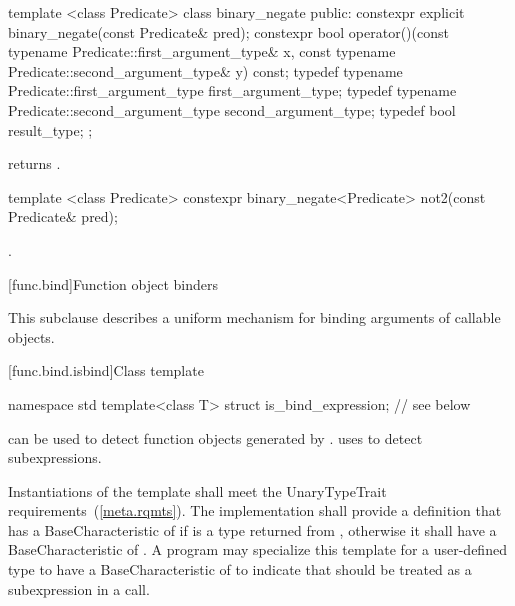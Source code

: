 %
\begin{itemdecl}
template <class Predicate>
  class binary_negate {
  public:
    constexpr explicit binary_negate(const Predicate& pred);
    constexpr bool operator()(const typename Predicate::first_argument_type& x,
        const typename Predicate::second_argument_type& y) const;
  typedef typename Predicate::first_argument_type first_argument_type;
  typedef typename Predicate::second_argument_type second_argument_type;
  typedef bool result_type;
  };
\end{itemdecl}

\begin{itemdescr}
\pnum
{} returns .
\end{itemdescr}

%
\begin{itemdecl}
template <class Predicate>
  constexpr binary_negate<Predicate> not2(const Predicate& pred);
\end{itemdecl}

\begin{itemdescr}
\pnum
\returns
{}.
\end{itemdescr}

[func.bind]{Function object binders}%

\pnum
This subclause describes a uniform mechanism for binding
arguments of callable objects.

[func.bind.isbind]{Class template }

%
\begin{codeblock}
namespace std {
  template<class T> struct is_bind_expression; // see below
}
\end{codeblock}

\pnum
{} can be used to detect function objects
generated by . 
uses  to detect subexpressions.

\pnum
Instantiations of the  template shall meet
the UnaryTypeTrait requirements~(\ref{meta.rqmts}). The implementation
shall provide a definition that has a BaseCharacteristic of
 if  is a type returned from ,
otherwise it shall have a BaseCharacteristic of .
A program may specialize this template for a user-defined type 
to have a BaseCharacteristic of  to indicate that
 should be treated as a subexpression in a  call.

